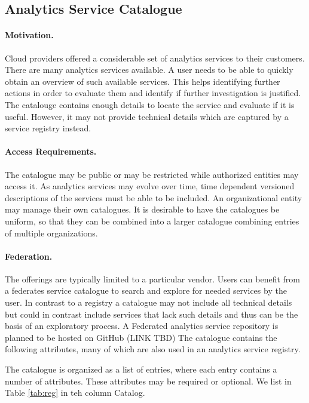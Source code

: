 
\subsection{Analytics Service Catalogue}
\label{sec:catalog}

\paragraph*{Motivation.}
Cloud providers offered a considerable set of analytics services to
their customers. There are many analytics services available. A user
needs to be able to quickly obtain an overview of such available
services. This helps identifying further actions in order to evaluate
them and identify if further investigation is justified. The catalouge
contains enough details to locate the service and evaluate if it is
useful. However, it may not provide technical details which are
captured by a service registry instead.

\paragraph*{Access Requirements.}
The catalogue may be public or may be restricted while authorized
entities may access it. As analytics services may evolve over time,
time dependent versioned descriptions of the services must be able to
be included. An organizational entity may manage their own
catalogues. It is desirable to have the catalogues be uniform, so that
they can be combined into a larger catalogue combining entries of
multiple organizations.


\paragraph*{Federation.}
The offerings are typically limited to a particular vendor. Users can
benefit from a federates service catalogue to search and explore for
needed services by the user. In contrast to a registry a catalogue may
not include all technical details but could in contrast include
services that lack such details and thus can be the basis of an
exploratory process.  A Federated analytics service repository is
planned to be hosted on GitHub (LINK TBD) The catalogue contains the
following attributes, many of which are also used in an analytics
service registry.

The catalogue is organized as a list of entries, where each entry
contains a number of attributes. These attributes may be required or
optional. We list in Table \ref{tab:reg} in teh column Catalog.



